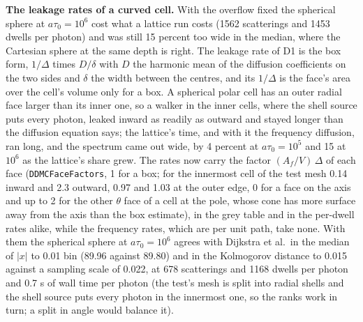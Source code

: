 \documentclass[11pt]{article}
\begin{document}
\textbf{The leakage rates of a curved cell.}  With the overflow fixed the spherical
sphere at $a\tau_0 = 10^6$ cost what a lattice run costs (1562 scatterings and 1453
dwells per photon) and was still 15 percent too wide in the median, where the
Cartesian sphere at the same depth is right.  The leakage rate of D1 is the box form,
$1/\Delta$ times $D/\delta$ with $D$ the harmonic mean of the diffusion coefficients
on the two sides and $\delta$ the width between the centres, and its $1/\Delta$ is the
face's area over the cell's volume only for a box.  A spherical polar cell has an
outer radial face larger than its inner one, so a walker in the inner cells, where
the shell source puts every photon, leaked inward as readily as outward and stayed
longer than the diffusion equation says; the lattice's time, and with it the
frequency diffusion, ran long, and the spectrum came out wide, by 4 percent at
$a\tau_0 = 10^5$ and 15 at $10^6$ as the lattice's share grew.  The rates now carry
the factor $(A_f/V)\,\Delta$ of each face (\texttt{DDMCFaceFactors}, 1 for a box; for
the innermost cell of the test mesh 0.14 inward and 2.3 outward, 0.97 and 1.03 at the
outer edge, 0 for a face on the axis and up to 2 for the other $\theta$ face of a cell
at the pole, whose cone has more surface away from the axis than the box estimate),
in the grey table and in the per-dwell rates alike, while the frequency rates, which
are per unit path, take none.
With them the spherical sphere at $a\tau_0 = 10^6$ agrees with Dijkstra et al.\ in
the median of $|x|$ to 0.01 bin (89.96 against 89.80) and in the Kolmogorov distance
to 0.015 against a sampling scale of 0.022, at 678 scatterings and 1168 dwells per
photon and 0.7 s of wall time per photon (the test's mesh is split into radial shells
and the shell source puts every photon in the innermost one, so the ranks work in
turn; a split in angle would balance it).
\end{document}
